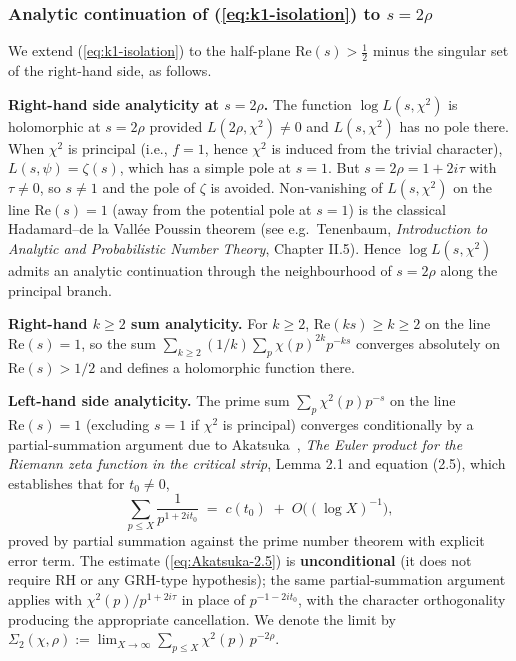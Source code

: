 \subsubsection{Analytic continuation of (\ref{eq:k1-isolation}) to \(s = 2\rho\)}

We extend (\ref{eq:k1-isolation}) to the half-plane \(\mathrm{Re}(s) > \tfrac12\) minus the singular set of the right-hand side, as follows.

\textbf{Right-hand side analyticity at \(s = 2\rho\).} The function
\(\log L(s, \chi^2)\) is holomorphic at \(s = 2\rho\) provided
\(L(2\rho, \chi^2) \ne 0\) and \(L(s, \chi^2)\) has no pole there. When
\(\chi^2\) is principal (i.e., \(f = 1\), hence \(\chi^2\) is induced from
the trivial character), \(L(s, \psi) = \zeta(s)\), which has a simple
pole at \(s = 1\). But \(s = 2\rho = 1 + 2i\tau\) with \(\tau \ne 0\), so
\(s \ne 1\) and the pole of \(\zeta\) is avoided. Non-vanishing of
\(L(s, \chi^2)\) on the line \(\mathrm{Re}(s) = 1\) (away from the
potential pole at \(s = 1\)) is the classical Hadamard--de la Vallée
Poussin theorem (see e.g.~Tenenbaum, \emph{Introduction to Analytic and
Probabilistic Number Theory}, Chapter II.5). Hence
\(\log L(s, \chi^2)\) admits an analytic continuation through the
neighbourhood of \(s = 2\rho\) along the principal branch.

\textbf{Right-hand \(k \ge 2\) sum analyticity.} For \(k \ge 2\),
\(\mathrm{Re}(ks) \ge k \ge 2\) on the line \(\mathrm{Re}(s) = 1\), so the
sum \(\sum_{k \ge 2} (1/k) \sum_p \chi(p)^{2k} p^{-ks}\) converges
absolutely on \(\mathrm{Re}(s) > 1/2\) and defines a holomorphic
function there.

\textbf{Left-hand side analyticity.} The prime sum
\(\sum_{p} \chi^2(p) p^{-s}\) on the line \(\mathrm{Re}(s) = 1\)
(excluding \(s = 1\) if \(\chi^2\) is principal) converges conditionally
by a partial-summation argument due to Akatsuka~\cite{AkatsukaH2013EulerProduct}, \emph{The Euler
product for the Riemann zeta function in the critical strip},
Lemma 2.1 and equation (2.5), which establishes that for \(t_0 \ne 0\),
\begin{equation}
\label{eq:Akatsuka-2.5}
\sum_{p \le X} \frac{1}{p^{1 + 2it_0}} \;=\; c(t_0) \;+\; O\!\bigl((\log X)^{-1}\bigr),
\end{equation}
proved by partial summation against the prime number theorem with
explicit error term. The estimate (\ref{eq:Akatsuka-2.5}) is
\textbf{unconditional} (it does not require RH or any GRH-type
hypothesis); the same partial-summation argument applies with
\(\chi^2(p)/p^{1+2i\tau}\) in place of \(p^{-1-2it_0}\), with the
character orthogonality producing the appropriate cancellation. We
denote the limit by
\(\Sigma_2(\chi,\rho) := \lim_{X \to \infty} \sum_{p \le X} \chi^2(p)\,p^{-2\rho}\).

